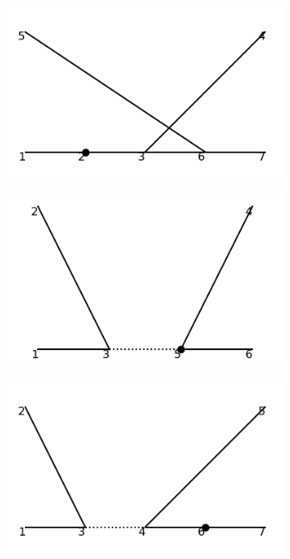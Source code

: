\documentclass[11pt,a4paper,twoside,pdf]{article}
\numberwithin{equation}{section}
\begin{document}
\begin{figure}[h!]
\begin{subfigure}[t]{0.16\textwidth}
    \end{subfigure}
    \hfill
    \begin{subfigure}[t]{0.16\textwidth}
        \centering
        \includegraphics[width=\textwidth]{plots/order4_2to2/counterterms/19.png}
    \end{subfigure}
    \hfill
    \begin{subfigure}[t]{0.16\textwidth}
        \centering
        \includegraphics[width=\textwidth]{plots/order4_2to2/counterterms/20.png}
    \end{subfigure}
    \hfill
    \begin{subfigure}[t]{0.16\textwidth}
        \centering
        \includegraphics[width=\textwidth]{plots/order4_2to2/counterterms/21.png}

\end{subfigure}
\end{figure}
\end{document}
